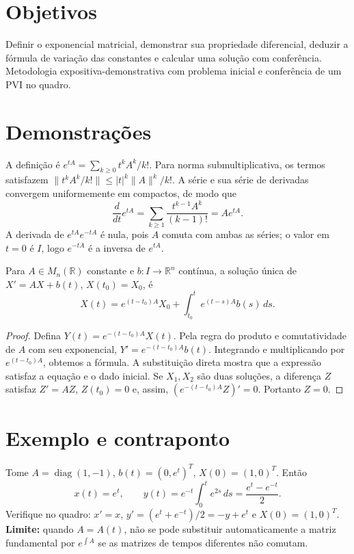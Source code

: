 \documentclass[11pt,a4paper]{article}
\begin{document}
\section{Objetivos}
Definir o exponencial matricial, demonstrar sua propriedade diferencial, deduzir a fórmula de variação das constantes e calcular uma solução com conferência. Metodologia expositiva-demonstrativa com problema inicial e conferência de um PVI no quadro.
\section{Demonstrações}
A definição é $e^{tA}=\sum_{k\ge0}t^kA^k/k!$. Para norma submultiplicativa, os termos satisfazem $\|t^kA^k/k!\|\le |t|^k\|A\|^k/k!$. A série e sua série de derivadas convergem uniformemente em compactos, de modo que
\[
\frac{d}{dt}e^{tA}=\sum_{k\ge1}\frac{t^{k-1}A^k}{(k-1)!}=Ae^{tA}.
\]
A derivada de $e^{tA}e^{-tA}$ é nula, pois $A$ comuta com ambas as séries; o valor em $t=0$ é $I$, logo $e^{-tA}$ é a inversa de $e^{tA}$.
\begin{teorema}
Para $A\in M_n(\mathbb R)$ constante e $b:I\to\mathbb R^n$ contínua, a solução única de $X'=AX+b(t)$, $X(t_0)=X_0$, é
\[
X(t)=e^{(t-t_0)A}X_0+\int_{t_0}^{t}e^{(t-s)A}b(s)\,ds.
\]
\end{teorema}
\begin{proof}
Defina $Y(t)=e^{-(t-t_0)A}X(t)$. Pela regra do produto e comutatividade de $A$ com seu exponencial,
$Y'=e^{-(t-t_0)A}b(t)$. Integrando e multiplicando por $e^{(t-t_0)A}$, obtemos a fórmula. A substituição direta mostra que a expressão satisfaz a equação e o dado inicial. Se $X_1,X_2$ são duas soluções, a diferença $Z$ satisfaz $Z'=AZ$, $Z(t_0)=0$ e, assim, $(e^{-(t-t_0)A}Z)'=0$. Portanto $Z=0$.
\end{proof}
\section{Exemplo e contraponto}
Tome $A=\operatorname{diag}(1,-1)$, $b(t)=(0,e^t)^T$, $X(0)=(1,0)^T$. Então
\[
x(t)=e^t,\qquad y(t)=e^{-t}\int_0^t e^{2s}\,ds
=\frac{e^t-e^{-t}}2.
\]
Verifique no quadro: $x'=x$, $y'=(e^t+e^{-t})/2=-y+e^t$ e $X(0)=(1,0)^T$. \textbf{Limite:} quando $A=A(t)$, não se pode substituir automaticamente a matriz fundamental por $e^{\int A}$ se as matrizes de tempos diferentes não comutam.
\end{document}
